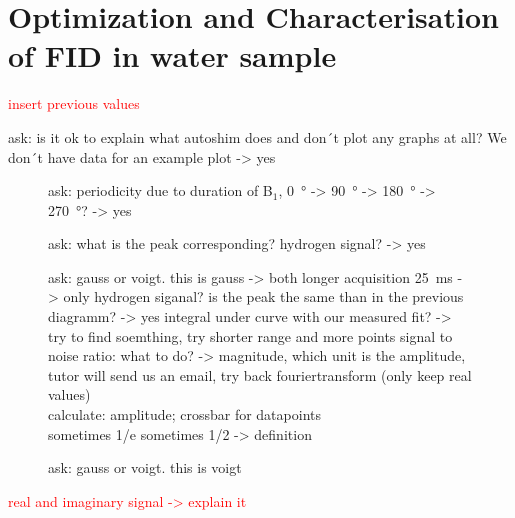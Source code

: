 \section{Optimization and Characterisation of FID in water sample}
\label{sec:OptimizationandCharacterisationofFIDinwatersample}

\textcolor{red}{insert previous values}

ask: is it ok to explain what autoshim does and don´t plot any graphs at all? We don´t have data for an example plot -> yes

\begin{figure}[H]
    \centering
    
    \caption[]{ask: periodicity due to duration of B$_1$, \SI{0}{\degree} -> \SI{90}{\degree} -> \SI{180}{\degree} -> \SI{270}{\degree}? -> yes}
    \label{fig:B1dauer}
\end{figure}

\begin{figure}[H]
    \centering
    
    \caption[]{}
    \label{fig:pulsedurationbeispiel}
\end{figure}

\begin{figure}[H]
    \centering
    
    \caption[]{ask: what is the peak corresponding? hydrogen signal? -> yes}
    \label{fig:Pulsandcollect}
\end{figure}



\begin{figure}[H]
    \centering
    
    \caption[]{ask: gauss or voigt. this is gauss -> both\newline
    longer acquisition \SI{25}{\milli \second} -> only hydrogen siganal? is the peak the same than in the previous diagramm?  -> yes\newline
    integral under curve with our measured fit? -> try to find soemthing, try shorter range and more points\newline
    signal to noise ratio: what to do? -> magnitude, which unit is the amplitude, tutor will send us an email, try back fouriertransform (only keep real values)
    \\
    calculate: amplitude; crossbar for datapoints\\
    sometimes 1/e sometimes 1/2 -> definition}
    \label{fig:Pulsandcollect138_delay_25_gauss}
\end{figure}
\begin{figure}[H]
    \centering
    
    \caption[]{ask: gauss or voigt. this is voigt}
    \label{fig:PulsandcollePulsandcollect138_delay_25_voigtctlangerdelay}
\end{figure}

\textcolor{red}{real and imaginary signal -> explain it}